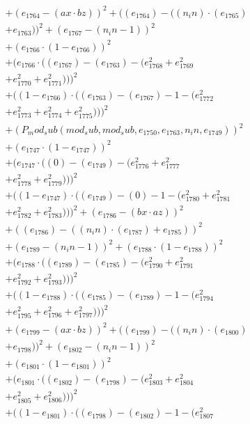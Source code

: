 \documentclass[10pt, a4paper]{article}
\begin{document}
\begin{align*}
& + (e_{1764} - (ax  \cdot  bz))^{2} + ((e_{1764}) - ((n_in)  \cdot  (e_{1765}) \\
& + e_{1763}))^{2} + (e_{1767} - (n_in - 1))^{2} \\
& + (e_{1766}  \cdot  (1 - e_{1766}))^{2} \\
& + (e_{1766}  \cdot  ((e_{1767}) - (e_{1763}) - (e_{1768}^{2} + e_{1769}^{2} \\
& + e_{1770}^{2} + e_{1771}^{2})))^{2} \\
& + ((1 - e_{1766})  \cdot  ((e_{1763}) - (e_{1767}) - 1 - (e_{1772}^{2} \\
& + e_{1773}^{2} + e_{1774}^{2} + e_{1775}^{2})))^{2} \\
& + (P_mod_sub(mod_sub, mod_sub, e_{1750}, e_{1763}, n_in, e_{1749}))^{2} \\
& + (e_{1747}  \cdot  (1 - e_{1747}))^{2} \\
& + (e_{1747}  \cdot  ((0) - (e_{1749}) - (e_{1776}^{2} + e_{1777}^{2} \\
& + e_{1778}^{2} + e_{1779}^{2})))^{2} \\
& + ((1 - e_{1747})  \cdot  ((e_{1749}) - (0) - 1 - (e_{1780}^{2} + e_{1781}^{2} \\
& + e_{1782}^{2} + e_{1783}^{2})))^{2} + (e_{1786} - (bx  \cdot  az))^{2} \\
& + ((e_{1786}) - ((n_in)  \cdot  (e_{1787}) + e_{1785}))^{2} \\
& + (e_{1789} - (n_in - 1))^{2} + (e_{1788}  \cdot  (1 - e_{1788}))^{2} \\
& + (e_{1788}  \cdot  ((e_{1789}) - (e_{1785}) - (e_{1790}^{2} + e_{1791}^{2} \\
& + e_{1792}^{2} + e_{1793}^{2})))^{2} \\
& + ((1 - e_{1788})  \cdot  ((e_{1785}) - (e_{1789}) - 1 - (e_{1794}^{2} \\
& + e_{1795}^{2} + e_{1796}^{2} + e_{1797}^{2})))^{2} \\
& + (e_{1799} - (ax  \cdot  bz))^{2} + ((e_{1799}) - ((n_in)  \cdot  (e_{1800}) \\
& + e_{1798}))^{2} + (e_{1802} - (n_in - 1))^{2} \\
& + (e_{1801}  \cdot  (1 - e_{1801}))^{2} \\
& + (e_{1801}  \cdot  ((e_{1802}) - (e_{1798}) - (e_{1803}^{2} + e_{1804}^{2} \\
& + e_{1805}^{2} + e_{1806}^{2})))^{2} \\
& + ((1 - e_{1801})  \cdot  ((e_{1798}) - (e_{1802}) - 1 - (e_{1807}^{2} \\

\end{align*}
\end{document}
